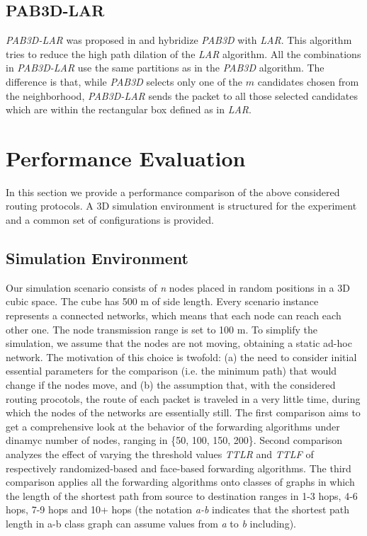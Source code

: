 \documentclass[journal,comsoc]{IEEEtran}
\begin{document}
\subsection{PAB3D-LAR}
\emph{PAB3D-LAR} was proposed in \cite{abdallah:high} and hybridize \emph{PAB3D} with \emph{LAR}. This algorithm tries to reduce the high path dilation of the \emph{LAR} algorithm. All the combinations in \emph{PAB3D-LAR} use the same partitions as in the \emph{PAB3D} algorithm. The difference is that, while \emph{PAB3D} selects only one of the \(m\) candidates chosen from the neighborhood, \emph{PAB3D-LAR} sends the packet to all those selected candidates which are within the rectangular box defined as in \emph{LAR}.


\section{Performance Evaluation}
In this section we provide a performance comparison of the above considered routing protocols. A 3D simulation environment is structured for the experiment and a common set of configurations is provided.

\subsection{Simulation Environment}
Our simulation scenario consists of \textit{n} nodes placed in random positions in a 3D cubic space. The cube has 500 m of side length. Every scenario instance represents a connected networks, which means that each node can reach each other one. The node transmission range is set to 100 m. To simplify the simulation, we assume that the nodes are not moving, obtaining a static ad-hoc network. The motivation of this choice is twofold: (a) the need to consider initial essential parameters for the comparison (i.e. the minimum path) that would change if the nodes move, and (b) the assumption that, with the considered routing procotols, the route of each packet is traveled in a very little time, during which the nodes of the networks are essentially still. The first comparison aims to get a comprehensive look at the behavior of the forwarding algorithms under dinamyc number of nodes, ranging in \{50, 100, 150, 200\}. Second comparison analyzes the effect of varying the threshold values \emph{TTLR} and \emph{TTLF} of respectively randomized-based and face-based forwarding algorithms. The third comparison applies all the forwarding algorithms onto classes of graphs in which the length of the shortest path from source to destination ranges in 1-3 hops, 4-6 hops, 7-9 hops and 10+ hops (the notation \emph{a-b} indicates that the shortest path length in a-b class graph can assume values from \emph{a} to \emph{b} including).
\end{document}
